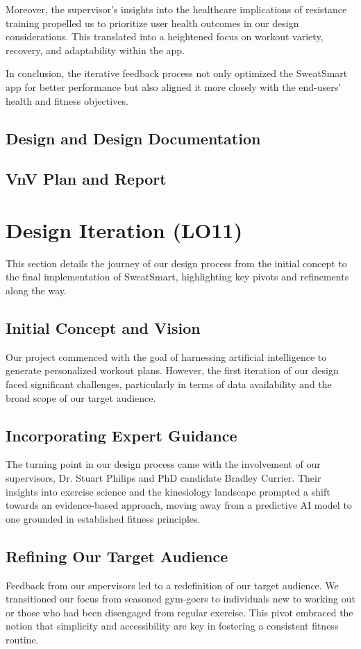 \documentclass{article}
\begin{document}
Moreover, the supervisor's insights into the healthcare implications of resistance training propelled us to prioritize user health outcomes in our design considerations. This translated into a heightened focus on workout variety, recovery, and adaptability within the app.

In conclusion, the iterative feedback process not only optimized the SweatSmart app for better performance but also aligned it more closely with the end-users' health and fitness objectives.

\subsection{Design and Design Documentation}

\subsection{VnV Plan and Report}

\section{Design Iteration (LO11)}

This section details the journey of our design process from the initial concept to the final implementation of SweatSmart, highlighting key pivots and refinements along the way.

\subsection{Initial Concept and Vision}
Our project commenced with the goal of harnessing artificial intelligence to generate personalized workout plans. However, the first iteration of our design faced significant challenges, particularly in terms of data availability and the broad scope of our target audience.

\subsection{Incorporating Expert Guidance}
The turning point in our design process came with the involvement of our supervisors, Dr. Stuart Philips and PhD candidate Bradley Currier. Their insights into exercise science and the kinesiology landscape prompted a shift towards an evidence-based approach, moving away from a predictive AI model to one grounded in established fitness principles.

\subsection{Refining Our Target Audience}
Feedback from our supervisors led to a redefinition of our target audience. We transitioned our focus from seasoned gym-goers to individuals new to working out or those who had been disengaged from regular exercise. This pivot embraced the notion that simplicity and accessibility are key in fostering a consistent fitness routine.
\end{document}
